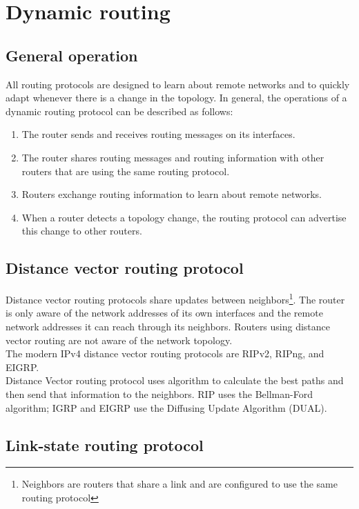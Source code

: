 \chapter{Dynamic routing}

\section{General operation}

All routing protocols are designed to learn about remote networks and to quickly adapt whenever there is a change in the topology. In general, the operations of a dynamic routing protocol can be described as follows:

\begin{enumerate}
\item The router sends and receives routing messages on its interfaces. 
\item The router shares routing messages and routing information with other routers that are using the same routing protocol. 
\item Routers exchange routing information to learn about remote networks. 
\item When a router detects a topology change, the routing protocol can advertise this change to other routers. 
\end{enumerate}

\section{Distance vector routing protocol}

Distance vector routing protocols share updates between neighbors\footnote{Neighbors are routers that share a link and are configured to use the same routing protocol}. The router is only aware of the network addresses of its own interfaces and the remote network addresses it can reach through its neighbors. Routers using distance vector routing are not aware of the network topology.\\

The modern IPv4 distance vector routing protocols are RIPv2, RIPng, and EIGRP.\\

Distance Vector routing protocol uses algorithm to calculate the best paths and then send that information to the neighbors. RIP uses the Bellman-Ford algorithm; IGRP and EIGRP use the Diffusing Update Algorithm (DUAL). 

\section{Link-state routing protocol}

